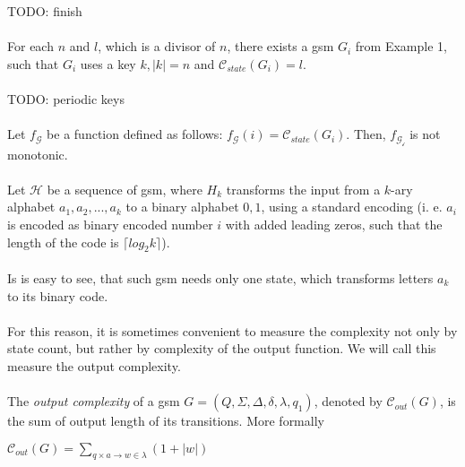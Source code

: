 \documentclass[12pt,oneside,a4paper]{book}
\begin{document}
\color{red}TODO: finish\color{black}\\
\square

\paragraph{}
\clema For each $n$ and $l$, which is a divisor of $n$, there exists a gsm $G_i$ from Example 1, such that $G_i$ uses a key $k, |k| = n$ and $\mathscr{C}_{state}(G_i) = l$.

\paragraph{}
\dokaz

\color{red}TODO: periodic keys\color{black}\\
\square

\paragraph{}
\cdosledok Let $f_{\mathcal{G}}$ be a function defined as follows: $f_{\mathcal{G}}(i) = \mathscr{C}_{state}(G_i)$. Then, $f_{\mathcal{G_i}}$ is not monotonic.

\paragraph{}
\cpriklad Let $\mathcal{H}$ be a sequence of gsm, where $H_{k}$ transforms the input from a $k$-ary alphabet $a_1, a_2, ..., a_k$ to a binary alphabet $0,1$, using a standard encoding (i. e. $a_i$ is encoded as binary encoded number $i$ with added leading zeros, such that the length of the code is $\lceil log_2 k \rceil$).

\paragraph{}
Is is easy to see, that such gsm needs only one state, which transforms letters $a_k$ to its binary code.

\paragraph{}
For this reason, it is sometimes convenient to measure the complexity not only by state count, but rather by complexity of the output function. We will call this measure the output complexity.

\paragraph{}
 The \emph{output complexity} of a gsm $G = (Q, \Sigma, \Delta, \delta, \lambda, q_1)$, denoted by $\mathscr{C}_{out}(G)$, is the sum of output length of its transitions. More formally \\
\centerline{$\mathscr{C}_{out}(G) = \sum_{q\times a \rightarrow w \in \lambda} (1 + |w|)$}
\end{document}
